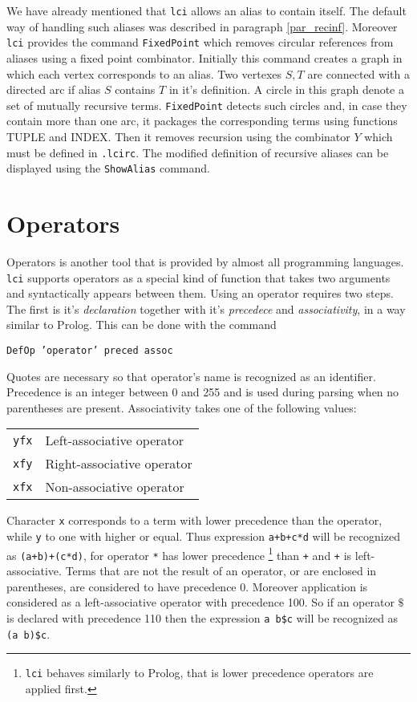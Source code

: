 \documentclass[a4paper,11pt]{article}
\newcommand{\lci}{\texttt{lci}}
\newcommand{\kwd}[1]{\texttt{#1}}
\begin{document}
We have already mentioned that \lci{} allows an alias to contain itself. The
default way of handling such aliases was described in paragraph \ref{par_recinf}.
Moreover \lci{} provides the command \kwd{FixedPoint} which removes circular references
from aliases using a fixed point combinator. Initially this command creates a
graph in which each vertex corresponds to an alias. Two vertexes $S,T$ are connected
with a directed arc if alias $S$ contains $T$ in it's definition. A circle in
this graph denote a set of mutually recursive terms. \kwd{FixedPoint} detects such
circles and, in case they contain more than one arc, it packages the corresponding
terms using functions TUPLE and INDEX. Then it removes recursion using the combinator
$Y$ which must be defined in \kwd{.lcirc}. The modified definition of recursive
aliases can be displayed using the \kwd{ShowAlias} command.

\section{Operators}
\label{sec_oper}
Operators is another tool that is provided by almost all programming languages.
\lci{} supports operators as a special kind of function that takes two arguments
and syntactically appears between them. Using an operator requires two steps.
The first is it's \emph{declaration} together with it's \emph{precedece} and
\emph{associativity}, in a way similar to Prolog. This can be done with the command
\begin{center}
	\kwd{DefOp 'operator' preced assoc}
\end{center}
Quotes are necessary so that operator's name is recognized as an identifier. Precedence
is an integer between 0 and 255 and is used during parsing when no parentheses
are present. Associativity takes one of the following values:
\begin{center}
	\begin{tabular}{cl}
		\kwd{yfx} & Left-associative operator \\
		\kwd{xfy} & Right-associative operator \\
		\kwd{xfx} & Non-associative operator
	\end{tabular}
\end{center}

Character \kwd{x} corresponds to a term with lower precedence than the operator,
while \kwd{y} to one with higher or equal. Thus expression \kwd{a+b+c*d}
will be recognized as \kwd{(a+b)+(c*d)}, for operator \kwd{*} has lower precedence
\footnote{\lci{} behaves similarly to Prolog, that is lower precedence operators
	are applied first.}
than \kwd{+} and \kwd{+} is left-associative. Terms that are not the result of
an operator, or are enclosed in parentheses, are considered to have precedence 0.
Moreover application is considered as a left-associative operator with precedence
100. So if an operator $\kwd{\$}$ is declared with precedence 110 then the
expression \hbox{\kwd{a b\$c}} will be recognized as \hbox{\kwd{(a b)\$c}}.
\end{document}
